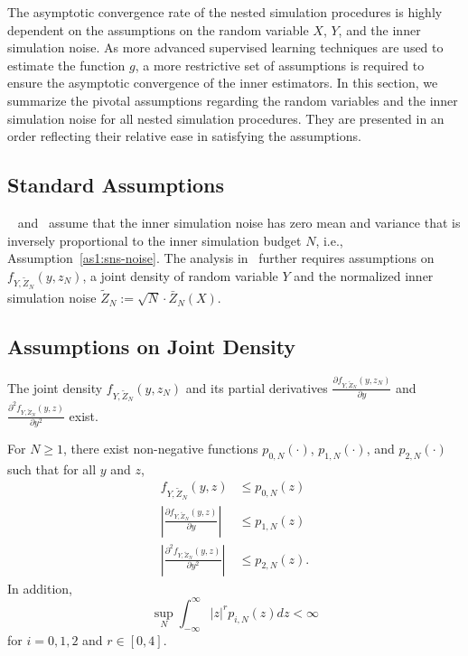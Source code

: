 The asymptotic convergence rate of the nested simulation procedures is highly dependent on the assumptions on the random variable $X$, $Y$, and the inner simulation noise.
As more advanced supervised learning techniques are used to estimate the function $g$, a more restrictive set of assumptions is required to ensure the asymptotic convergence of the inner estimators.
In this section, we summarize the pivotal assumptions regarding the random variables and the inner simulation noise for all nested simulation procedures. 
They are presented in an order reflecting their relative ease in satisfying the assumptions.

\subsection{Standard Assumptions}
~\cite{gordy2010nested} and~\cite{broadie2015risk} assume that the inner simulation noise has zero mean and variance that is inversely proportional to the inner simulation budget $N$, i.e., Assumption~\ref{as1:sns-noise}.
The analysis in~\cite{gordy2010nested} further requires assumptions on $f_{Y,\tilde{Z}_N}(y,z_N)$, a joint density of random variable $Y$ and the normalized inner simulation noise $\tilde{Z}_N := \sqrt{N} \cdot\bar{Z}_N(X)$.

\subsection{Assumptions on Joint Density}

\begin{assumption}\label{as1:sns-joint-density}
    The joint density $f_{Y,\tilde{Z}_N}(y,z_N)$ and its partial derivatives 
    $\frac{\partial f_{Y,\tilde{Z}_N}(y,z_N)}{\partial y}$ and $\frac{\partial^2 f_{Y,\tilde{Z}_N}(y,z)}{\partial y^2}$ exist.
\end{assumption}

\begin{assumption}\label{as1:sns-joint-density-bound}
    For $N \geq 1$, there exist non-negative functions $p_{0, N}(\cdot)$, $p_{1, N}(\cdot)$, and $p_{2, N}(\cdot)$ such that for all $y$ and $z$,
    \begin{align*}
        f_{Y,\tilde{Z}_N}(y,z) & \leq p_{0, N}(z) \\
        \left| \frac{\partial f_{Y,\tilde{Z}_N}(y,z)}{\partial y} \right| & \leq p_{1, N}(z) \\
        \left| \frac{\partial^2 f_{Y,\tilde{Z}_N}(y,z)}{\partial y^2} \right| & \leq p_{2, N}(z).
    \end{align*}
    In addition, 
    \begin{equation}
        \sup_N \int_{-\infty}^{\infty} |z|^r p_{i, N}(z) dz < \infty
    \end{equation}
    for $i = 0, 1, 2$ and $r \in [0, 4]$.
\end{assumption}

